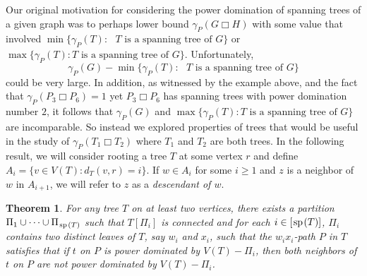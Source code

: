 \documentclass[11pt]{article}
\newtheorem{theorem}{Theorem}
\newcommand{\spider}{\hskip1pt \textrm{sp} \hskip1pt}
\begin{document}
Our original motivation for considering the power domination of spanning trees of a given graph was to perhaps lower bound $\gamma_P(G\Box H)$ with some value that involved $\min\{\gamma_P(T): \text{ $T$ is a spanning tree of $G$}\}$ or $\max\{\gamma_P(T): \text{$T$ is a spanning tree of $G$}\}$. Unfortunately, \[\gamma_P(G) -\min\{\gamma_P(T): \text{ $T$ is a spanning tree of $G$}\}\] could be very large. In addition, as witnessed by the example above, and the fact that $\gamma_P(P_3 \Box P_6)=1$ yet $P_3 \Box P_6$ has spanning trees with power domination number $2$, it follows that $\gamma_P(G)$ and $\max\{\gamma_P(T): \text{$T$ is a spanning tree of $G$}\}$ are incomparable. So instead we explored properties of trees that would be useful in the study of $\gamma_P(T_1\Box T_2)$ where $T_1$ and $T_2$ are both trees. In the following result, we will consider rooting a tree $T$ at some vertex $r$ and define $A_i = \{v \in V(T): d_T(v, r) = i\}$. If $w \in A_i$ for some $i \ge 1$ and $z$ is a neighbor of $w$ in $A_{i+1}$, we will refer to $z$ as a {\it descendant of $w$}. 

\begin{theorem}\label{thm:treepart} For any tree $T$ on at least two vertices, there exists a partition $\Pi_1 \cup \cdots \cup \Pi_{\spider(T)}$ such that $T[\Pi_i]$ is connected and for each $i \in [\spider(T)]$, $\Pi_i$ contains two distinct leaves of $T$, say  $w_i$ and $x_i$, such that the  $w_ix_i$-path $P$ in $T$ satisfies that if $t$ on $P$ is power dominated by $V(T) - \Pi_i$, then both neighbors of $t$ on $P$ are not power dominated by $V(T) - \Pi_i$. 
\label{thm:treeell}
\end{theorem}
\end{document}
